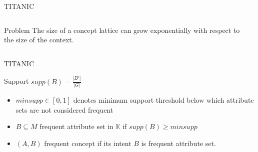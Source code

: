 \begin{frame}{TITANIC~\cite{titanic_2002}}
\begin{columns}
\begin{column}{0.7\textwidth}
\begin{alertblock}{Problem} %
The size of a concept lattice can grow exponentially with respect to the size of the context.
\end{alertblock}

\end{column}

\begin{column}{0.25\textwidth}





\end{column}
\end{columns}
\end{frame}


\begin{frame}{TITANIC~\cite{titanic_2002}}
\begin{definition}
Support $supp(B) = \frac{\left| B' \right|}{\left| G \right|}$
\end{definition}

\begin{itemize}
    \item<2-> $minsupp \in [0,1]$ denotes minimum support threshold below which attribute sets are not considered frequent
    \item<3-> $B \subseteq M$ frequent attribute set in $\mathbb{K}$ if $supp(B) \ge minsupp$
    \item<4-> $(A, B)$ frequent concept if its intent $B$ is frequent attribute set.
\end{itemize}


\end{frame}

